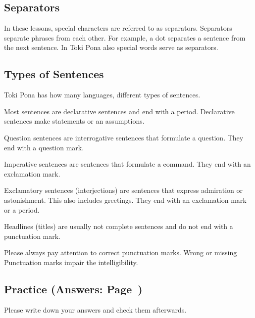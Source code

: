 %
\subsection*{Separators}
%
In these lessons, special characters are referred to as separators. 
Separators separate phrases from each other. 
For example, a dot separates a sentence from the next sentence. 
In Toki Pona also special words serve as separators. 

%
\subsection*{Types of Sentences}
%
Toki Pona has how many languages, different types of sentences. 

Most sentences are declarative sentences and end with a period. 
Declarative sentences make statements or an assumptions. 

Question sentences are interrogative sentences that formulate a question. 
They end with a question mark. 

Imperative sentences are sentences that formulate a command. 
They end with an exclamation mark.

Exclamatory sentences (interjections) are sentences that express admiration or astonishment. 
This also includes greetings. 
They end with an exclamation mark or a period.

Headlines (titles) are usually not complete sentences and do not end with a punctuation mark.

Please always pay attention to correct punctuation marks. Wrong or missing
Punctuation marks impair the intelligibility.

%
\newpage
\subsection*{Practice (Answers: Page~\pageref{'pronunciation_alphabet'})}

Please write down your answers and check them afterwards. 

